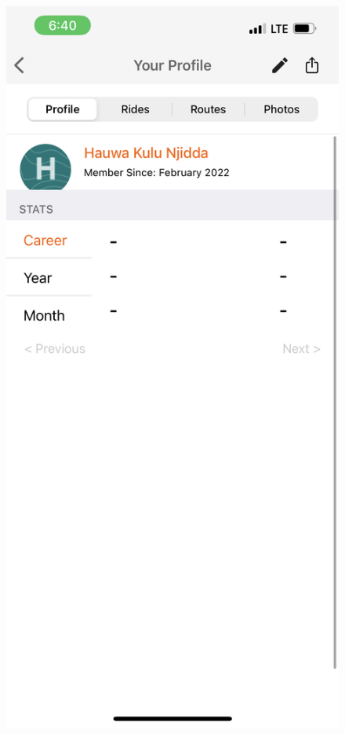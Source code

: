 \documentclass{l4proj}
\begin{document}
\begin{figure}
 \centering
 \begin{minipage}[b]{0.3\textwidth}
  \includegraphics[width=1\textwidth]{images/NAM.PNG}

\end{minipage}
\end{figure}
\end{document}
